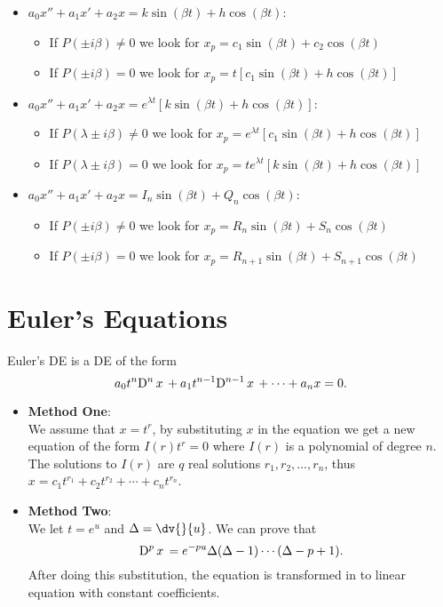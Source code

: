 \begin{itemize}
\begin{itemize}
	      \end{itemize}
	\item $a_0x'' +a_1x' + a_2x = k\sin(\beta t)+h\cos(\beta t)$:
	      \begin{itemize}
		      \item If $P(\pm i\beta)\neq0$ we look for $x_p=c_1\sin(\beta t)+c_2\cos(\beta t)$
		      \item If $P(\pm i\beta)=0$ we look for $x_p=t\left[c_1\sin(\beta t)+h\cos(\beta t)\right]$
	      \end{itemize}
	\item $a_0x'' +a_1x' + a_2x = e^{\lambda t}\left[k\sin(\beta t)+h\cos(\beta t)\right]$:
	      \begin{itemize}
		      \item If $P(\lambda \pm i\beta)\neq0$ we look for $x_p=e^{\lambda t}\left[c_1\sin(\beta t)+h\cos(\beta t)\right]$
		      \item If $P(\lambda \pm i\beta)=0$ we look for $x_p=te^{\lambda t}\left[k\sin(\beta t)+h\cos(\beta t)\right]$
	      \end{itemize}
	\item $a_0x'' +a_1x' + a_2x = I_n\sin(\beta t)+Q_n\cos(\beta t)$:
	      \begin{itemize}
		      \item If $P(\pm i\beta)\neq0$ we look for $x_p=R_n\sin(\beta t)+S_n\cos(\beta t)$
		      \item If $P(\pm i\beta)=0$ we look for $x_p=R_{n+1}\sin(\beta t)+S_{n+1}\cos(\beta t)$
	      \end{itemize}
\end{itemize}

\section{Euler's Equations}
Euler's DE is a DE of the form
\[
	a_0t^n\D[n]{x}+a_1t^{n-1}\D[n-1]{x} + \cdots + a_nx = 0
	.\]

\begin{itemize}
	\item \textbf{Method One}:\\
	      We assume that $x=t^r$, by substituting $x$ in the equation we get a new equation of the form $I(r)t^r=0$ where $I(r)$ is a polynomial of degree $n$. The solutions to $I(r)$ are $q$ real solutions $r_1,r_2,\ldots,r_n$, thus $x = c_1t^{r_1} + c_2t^{r_2} + \cdots + c_n t^{r_n}$.
	\item \textbf{Method Two}:\\
	      We let $t=e^u$ and $\Delta = \dv{}{u}$. We can prove that
	      \[
		      \D[p]{x} = e^{-p u}\Delta(\Delta-1)\cdots(\Delta-p+1)
		      .\]
	      After doing this substitution, the equation is transformed in to linear equation with constant coefficients.
\end{itemize}

